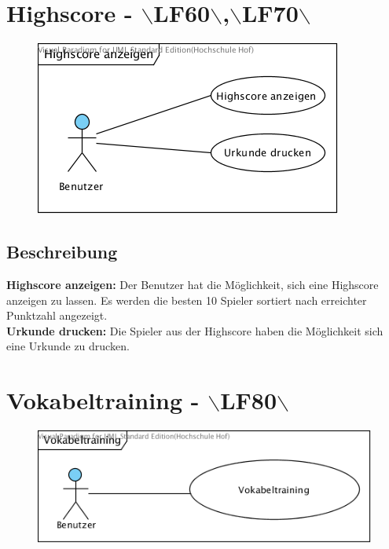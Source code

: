 \clearpage
\section{Highscore - $\backslash$LF60$\backslash$,$\backslash$LF70$\backslash$}
\begin{figure}[!h]
	\centering
    \includegraphics[width=\textwidth]{./Highscore.png}
	\label{layout_gesamt}
\end{figure}

\subsection{Beschreibung}
\textbf{Highscore anzeigen: } Der Benutzer hat die Möglichkeit, sich eine Highscore anzeigen zu lassen. Es werden die besten 10 Spieler sortiert nach erreichter Punktzahl angezeigt.\\
\textbf{Urkunde drucken: } Die Spieler aus der Highscore haben die Möglichkeit sich eine Urkunde zu drucken.

\clearpage
\section{Vokabeltraining - $\backslash$LF80$\backslash$}
\begin{figure}[!h]
	\centering
    \includegraphics[width=\textwidth]{./Vokabeltraining.png}
	\label{layout_gesamt}
\end{figure}

